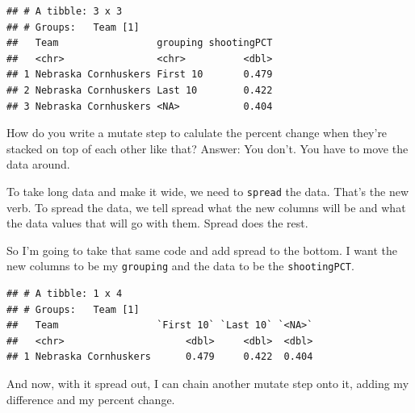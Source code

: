 \documentclass[]{book}
\newenvironment{Shaded}{\begin{snugshade}}{\end{snugshade}}
\newcommand{\KeywordTok}[1]{\textcolor[rgb]{0.13,0.29,0.53}{\textbf{#1}}}
\newcommand{\DataTypeTok}[1]{\textcolor[rgb]{0.13,0.29,0.53}{#1}}
\newcommand{\DecValTok}[1]{\textcolor[rgb]{0.00,0.00,0.81}{#1}}
\newcommand{\StringTok}[1]{\textcolor[rgb]{0.31,0.60,0.02}{#1}}
\newcommand{\OperatorTok}[1]{\textcolor[rgb]{0.81,0.36,0.00}{\textbf{#1}}}
\newcommand{\NormalTok}[1]{#1}
\begin{document}
\begin{verbatim}
## # A tibble: 3 x 3
## # Groups:   Team [1]
##   Team                 grouping shootingPCT
##   <chr>                <chr>          <dbl>
## 1 Nebraska Cornhuskers First 10       0.479
## 2 Nebraska Cornhuskers Last 10        0.422
## 3 Nebraska Cornhuskers <NA>           0.404
\end{verbatim}

How do you write a mutate step to calulate the percent change when
they're stacked on top of each other like that? Answer: You don't. You
have to move the data around.

To take long data and make it wide, we need to \texttt{spread} the data.
That's the new verb. To spread the data, we tell spread what the new
columns will be and what the data values that will go with them. Spread
does the rest.

So I'm going to take that same code and add spread to the bottom. I want
the new columns to be my \texttt{grouping} and the data to be the
\texttt{shootingPCT}.

\begin{Shaded}
\end{Shaded}

\begin{verbatim}
## # A tibble: 1 x 4
## # Groups:   Team [1]
##   Team                 `First 10` `Last 10` `<NA>`
##   <chr>                     <dbl>     <dbl>  <dbl>
## 1 Nebraska Cornhuskers      0.479     0.422  0.404
\end{verbatim}

And now, with it spread out, I can chain another mutate step onto it,
adding my difference and my percent change.
\end{document}
